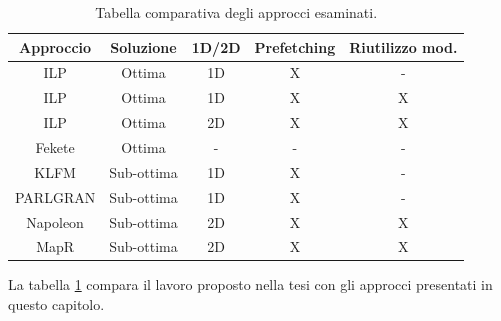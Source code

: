 \begin{table}[tb]
  \begin{center}
    \begin{tabular}{|c|c|c|c|c|}
      \hline
      \textbf{Approccio} & \textbf{Soluzione} & \textbf{1D/2D} & \textbf{Prefetching} & \textbf{Riutilizzo mod.}\\
      \hline
      \ac{ILP} \cite{BanerjeePhysicalConstraints} & Ottima & 1D & X & -\\
      \hline
      \ac{ILP} \cite{Redaelli1DILP} & Ottima & 1D & X & X\\
      \hline
      \ac{ILP} \cite{Redaelli2DILP} & Ottima & 2D & X & X \\
      \hline
      Fekete \cite{FeketeOptimal} & Ottima & - & - & - \\
      \hline
      KLFM \cite{BanerjeePhysicalConstraints} & Sub-ottima & 1D & X & -\\
      \hline
      PARLGRAN \cite{BanerjeePARLGRAN} & Sub-ottima & 1D & X & -\\
      \hline
      Napoleon \cite{Redaelli2DILP} & Sub-ottima & 2D & X & X\\
      \hline
      MapR & Sub-ottima & 2D & X & X\\
      \hline
    \end{tabular}
    \caption{Tabella comparativa degli approcci esaminati.}
    \label{tab:approcci}
  \end{center}
\end{table}


La tabella \ref{tab:approcci} compara il lavoro proposto nella tesi con gli approcci
presentati in questo capitolo.
